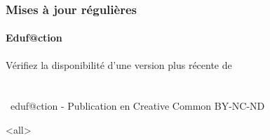 \documentclass[ignorenonframetext,9pt,allowframebreaks,aspectratio=169]{beamer}
\begin{document}
  \begin{frame}
  \frametitle{Mises à jour régulières}
  \framesubtitle{Eduf@ction~\umaila}
  {\begin{center} 
  {Vérifiez la disponibilité d'une version plus récente de} \\
  { }   \\ 
  {{\huge\ccbyncndeu}}  \\  
  {\the\year~eduf@ction - Publication en Creative Common BY-NC-ND }    \\  %
  {\safeqrcode[padding]{\GITfilename}}  
  \end{center} }
  \end{frame}

\mode<all>{\immediate\closeout\audioexport}
\end{document}
